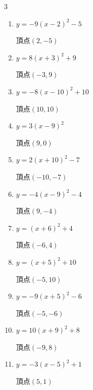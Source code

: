 \begin{multicols}{3}
\begin{enumerate}
        $\displaystyle 頂点\left( -4 , -8 \right)$

  \item $\displaystyle y=-9\left( x-2\right)^{2}-5$

        $\displaystyle 頂点\left( 2 , -5 \right)$

  \item $\displaystyle y=8\left( x+3\right)^{2}+9$

        $\displaystyle 頂点\left( -3 , 9 \right)$

  \item $\displaystyle y=-8\left( x-10\right)^{2}+10$

        $\displaystyle 頂点\left( 10 , 10 \right)$

  \item $\displaystyle y=3\left( x-9\right)^{2}$

        $\displaystyle 頂点\left( 9 , 0 \right)$

  \item $\displaystyle y=2\left( x+10\right)^{2}-7$

        $\displaystyle 頂点\left( -10 , -7 \right)$

  \item $\displaystyle y=-4\left( x-9\right)^{2}-4$

        $\displaystyle 頂点\left( 9 , -4 \right)$

  \item $\displaystyle y=\left( x+6\right)^{2}+4$

        $\displaystyle 頂点\left( -6 , 4 \right)$

\columnbreak %

  \item $\displaystyle y=\left( x+5\right)^{2}+10$

        $\displaystyle 頂点\left( -5 , 10 \right)$

  \item $\displaystyle y=-9\left( x+5\right)^{2}-6$

        $\displaystyle 頂点\left( -5 , -6 \right)$

  \item $\displaystyle y=10\left( x+9\right)^{2}+8$

        $\displaystyle 頂点\left( -9 , 8 \right)$

  \item $\displaystyle y=-3\left( x-5\right)^{2}+1$

        $\displaystyle 頂点\left( 5 , 1 \right)$


\end{enumerate}
\end{multicols}
